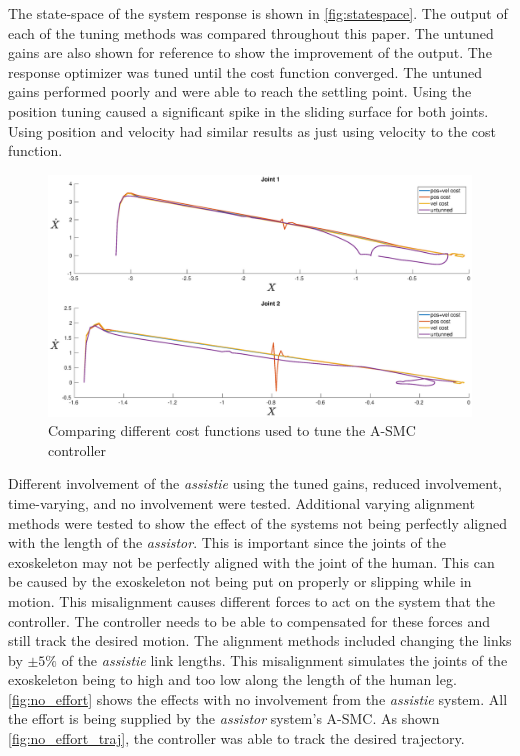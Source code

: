 The state-space of the system response is shown in  \autoref{fig:statespace}. The output of each of the tuning methods was compared throughout this paper. The untuned gains are also shown for reference to show the improvement of the output. The response optimizer was tuned until the cost function converged. The untuned gains performed poorly and were able to reach the settling point. Using the position tuning caused a significant spike in the sliding surface for both joints. Using position and velocity had similar results as just using velocity to the cost function. 


\begin{figure}[ht!]
    \centering
    \includegraphics[width=\linewidth]{images/controllers/statespace.eps}
    \caption[A-SMC State Space]{Comparing different cost functions used to tune the A-SMC controller}
    \label{fig:statespace}
\end{figure}

Different involvement of the \textit{assistie}  using the tuned gains, reduced involvement, time-varying, and no involvement were tested. Additional varying alignment methods were tested to show the effect of the systems not being perfectly aligned with the length of the \textit{assistor}. This is important since the joints of the exoskeleton may not be perfectly aligned with the joint of the human. This can be caused by the exoskeleton not being put on properly or slipping while in motion. This misalignment causes different forces to act on the system that the controller. The controller needs to be able to compensated for these forces and still track the desired motion.  The alignment methods included changing the links by $\pm 5\%$ of the \textit{assistie} link lengths. This misalignment simulates the joints of the exoskeleton being to high and too low along the length of the human leg. \autoref{fig:no_effort} shows the effects with no involvement from the \textit{assistie} system. All the effort is being supplied by the \textit{assistor} system's A-SMC. As shown \autoref{fig:no_effort_traj}, the controller was able to track the desired trajectory. 


